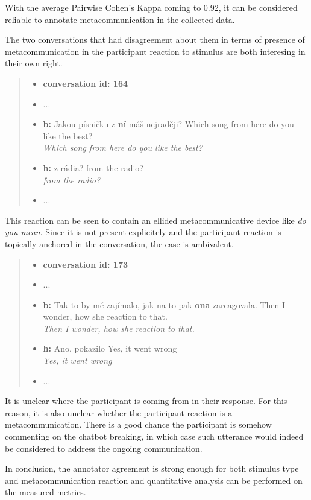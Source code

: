 \documentclass[12pt]{report}
\newcommand{\utterance}[3]{%
    \textbf{#1} #2%
    \ifx\relax#3\relax%
    \else \\ \textit{#3}%
    \fi%
}
\begin{document}
{With the average Pairwise Cohen's Kappa coming to 0.92,
it can be considered reliable to annotate metacommunication
in the collected data.

The two conversations that had disagreement about them in terms of
presence of metacommunication in the participant reaction to stimulus
are both interesing in their own right.


\begin{quote}
\begin{itemize}[label={}, leftmargin=0pt, itemsep=0.5em]
\item \textbf{conversation id: 164}
\item ...
\item \utterance{b:}{Jakou písničku z \textbf{ní} máš nejraději?}{Which song from here do you like the best?}
\item \utterance{h:}{z rádia?}{from the radio?}
\item ...
\end{itemize}
\end{quote}

This reaction can be seen to contain an ellided metacommunicative device like \textit{do you mean}.
Since it is not present explicitely and the participant reaction is topically anchored in the conversation,
the case is ambivalent.

\begin{quote}
\begin{itemize}[label={}, leftmargin=0pt, itemsep=0.5em]
\item \textbf{conversation id: 173}
\item ...
\item \utterance{b:}{Tak to by mě zajímalo, jak na to pak \textbf{ona} zareagovala.}{Then I wonder, how she reaction to that.}
\item \utterance{h:}{Ano, pokazilo}{Yes, it went wrong}
\item ...
\end{itemize}
\end{quote}

It is unclear where the participant is coming from in their response.
For this reason, it is also unclear whether the participant reaction is a metacommunication.
There is a good chance the participant is somehow commenting on the chatbot breaking,
in which case such utterance would indeed be considered to address the ongoing communication.

\par
In conclusion, the annotator agreement is
strong enough for both stimulus type and metacommunication reaction and
quantitative analysis can be performed on the measured metrics.





}
\end{document}
